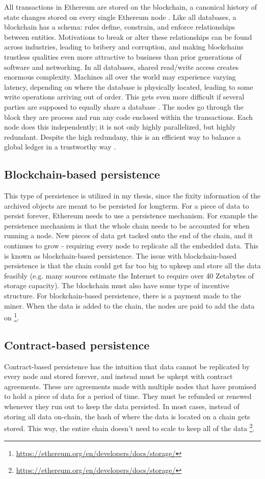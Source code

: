 All transactions in Ethereum are stored on the blockchain, a canonical history of state changes stored on every single Ethereum node \cite[12]{dannen2017introducing}.
Like all databases, a blockchain has a schema: rules define, constrain, and enforce relationships between entities. Motivations to break or alter these relationships can be found across industries, leading to bribery and corruption, and making blockchains trustless qualities even more attractive to business than prior generations of software and networking. In all databases, shared read/write access creates enormous complexity. Machines all over the world may experience varying latency, depending on where the database is physically located, leading to some write operations arriving out of order. This gets even more difficult if several parties are supposed to equally share a database \cite[20]{dannen2017introducing}. 
The nodes go through the block they are process and run any code enclosed within the transactions. Each node does this independently; it is not only highly parallelized, but highly redundant. Despite the high redundany, this is an efficient way to balance a global ledger in a trustworthy way \cite[50]{dannen2017introducing}.
\subsection{Blockchain-based persistence}
This type of persistence is utilized in my thesis, since the fixity information of the archived objects are meant to be persisted for longterm.
For a piece of data to persist forever, Ethereum needs to use a persistence mechanism. For example the persistence mechanism is that the whole chain needs to be accounted for when running a node. New pieces of data get tacked onto the end of the chain, and it continues to grow - requiring every node to replicate all the embedded data. This is known as blockchain-based persistence. The issue with blockchain-based persistence is that the chain could get far too big to upkeep and store all the data feasibly (e.g. many sources estimate the Internet to require over 40 Zetabytes of storage capacity). The blockchain must also have some type of incentive structure. For blockchain-based persistence, there is a payment made to the miner. When the data is added to the chain, the nodes are paid to add the data on \footnote{\url{https://ethereum.org/en/developers/docs/storage/}}.
\subsection{Contract-based persistence}
Contract-based persistence has the intuition that data cannot be replicated by every node and stored forever, and instead must be upkept with contract agreements. These are agreements made with multiple nodes that have promised to hold a piece of data for a period of time. They must be refunded or renewed whenever they run out to keep the data persisted. In most cases, instead of storing all data on-chain, the hash of where the data is located on a chain gets stored. This way, the entire chain doesn't need to scale to keep all of the data \footnote{\url{https://ethereum.org/en/developers/docs/storage/}}.
